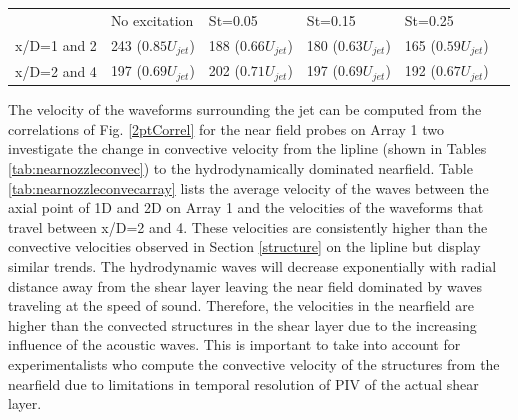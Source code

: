 \documentclass[english]{aiaa-tc}
\begin{document}
\begin{center}
	\begin{tabular}{|l|l|l|l|l|l}
		 & No excitation & St=0.05 & St=0.15 & St=0.25 \\
		x/D=1 and 2 & 243 ($0.85U_{jet}$) & 188 ($0.66U_{jet}$) & 180 ($0.63U_{jet}$) & 165 ($0.59U_{jet}$) \\
		x/D=2 and 4 & 197 ($0.69U_{jet}$) & 202 ($0.71U_{jet}$) & 197 ($0.69U_{jet}$) & 192 ($0.67U_{jet}$) \\
	\end{tabular}
	\label{tab:nearnozzleconvecarray}
\end{center}
The velocity of the waveforms surrounding the jet can be computed from the correlations of Fig. \ref{2ptCorrel} for the near field probes on Array 1 two investigate the change in convective velocity from the lipline (shown in Tables \ref{tab:nearnozzleconvec}) to the hydrodynamically dominated nearfield. Table \ref{tab:nearnozzleconvecarray} lists the average velocity of the waves between the axial point of 1D and 2D on Array 1 and the velocities of the waveforms that travel between x/D=2 and 4. These velocities are consistently higher than the convective velocities observed in Section \ref{structure} on the lipline but display similar trends. The hydrodynamic waves will decrease exponentially with radial distance away from the shear layer leaving the near field dominated by waves traveling at the speed of sound. Therefore, the velocities in the nearfield are higher than the convected structures in the shear layer due to the increasing influence of the acoustic waves. This is important to take into account for experimentalists who compute the convective velocity of the structures from the nearfield due to limitations in temporal resolution of PIV of the actual shear layer. 

\end{document}
